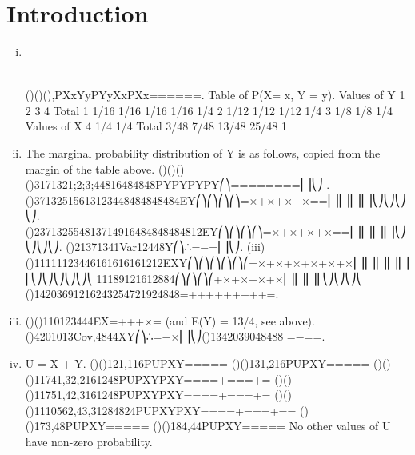 \documentclass{article}
\author{kobriendublin }
\date{December 2018}
\begin{document}
\section{Introduction}
\begin{enumerate}[(i)]
\item 
\begin{table}[]
\begin{tabular}{lllll}
 &  &  &  &  \\
 &  &  &  &  \\
 &  &  &  &  \\
 &  &  &  & 
\end{tabular}
\end{table}

 ()()(),PXxYyPYyXxPXx======.
Table of P(X= x, Y = y).
Values of Y
1
2
3
4
Total
1
1/16
1/16
1/16
1/16
1/4
2
1/12
1/12
1/12
1/4
3
1/8
1/8
1/4
Values of X
4
1/4
1/4
Total
3/48
7/48
13/48
25/48
1
\item The marginal probability distribution of Y is as follows, copied from the margin of the table above.
()()()()3171321;2;3;44816484848PYPYPYPY⎛⎞========⎜⎟⎝⎠ .
()37132515613123448484848484EY⎛⎞⎛⎞⎛⎞⎛⎞=×+×+×+×==⎜⎟⎜⎟⎜⎟⎜⎟⎝⎠⎝⎠⎝⎠⎝⎠.
()237132554813714916484848484812EY⎛⎞⎛⎞⎛⎞⎛⎞=×+×+×+×==⎜⎟⎜⎟⎜⎟⎜⎟⎝⎠⎝⎠⎝⎠⎝⎠.
()21371341Var12448Y⎛⎞∴=−=⎜⎟⎝⎠.
(iii) ()11111123446161616161212EXY⎛⎞⎛⎞⎛⎞⎛⎞⎛⎞⎛=×+×+×+×+×+×⎜⎟⎜⎟⎜⎟⎜⎟⎜⎟⎜⎝⎠⎝⎠⎝⎠⎝⎠⎝⎠⎝ 11189121612884⎛⎞⎛⎞⎛⎞⎛+×+×+×+×⎜⎟⎜⎟⎜⎟⎜⎝⎠⎝⎠⎝⎠⎝ ()14203691216243254721924848=+++++++++=.
\item 
()()110123444EX=+++×= (and E(Y) = 13/4, see above).
()4201013Cov,4844XY⎛⎞∴=−×⎜⎟⎝⎠()1342039048488 =−==.
\item  U = X + Y.
()()121,116PUPXY=====
()()131,216PUPXY=====
()()()11741,32,2161248PUPXYPXY====+===+=
()()()11751,42,3161248PUPXYPXY====+===+=
()()()1110562,43,31284824PUPXYPXY====+===+==
()()173,48PUPXY=====
()()184,44PUPXY=====
No other values of U have non-zero probability.
\end{enumerate}
\end{document}
